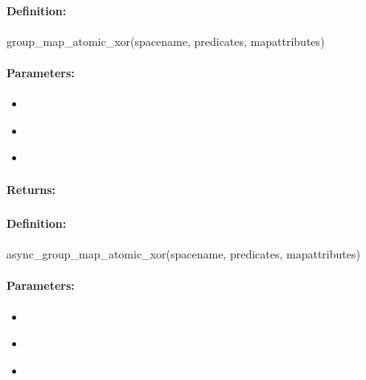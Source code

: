 \paragraph{Definition:}
\begin{rubycode}
group_map_atomic_xor(spacename, predicates, mapattributes)
\end{rubycode}

\paragraph{Parameters:}
\begin{itemize}[noitemsep]
\item {}\\

\item {}\\

\item {}\\

\end{itemize}

\paragraph{Returns:}


\pagebreak
\subsubsection{}
\label{api:ruby:async_group_map_atomic_xor}


\paragraph{Definition:}
\begin{rubycode}
async_group_map_atomic_xor(spacename, predicates, mapattributes)
\end{rubycode}

\paragraph{Parameters:}
\begin{itemize}[noitemsep]
\item {}\\

\item {}\\

\item {}\\

\end{itemize}

